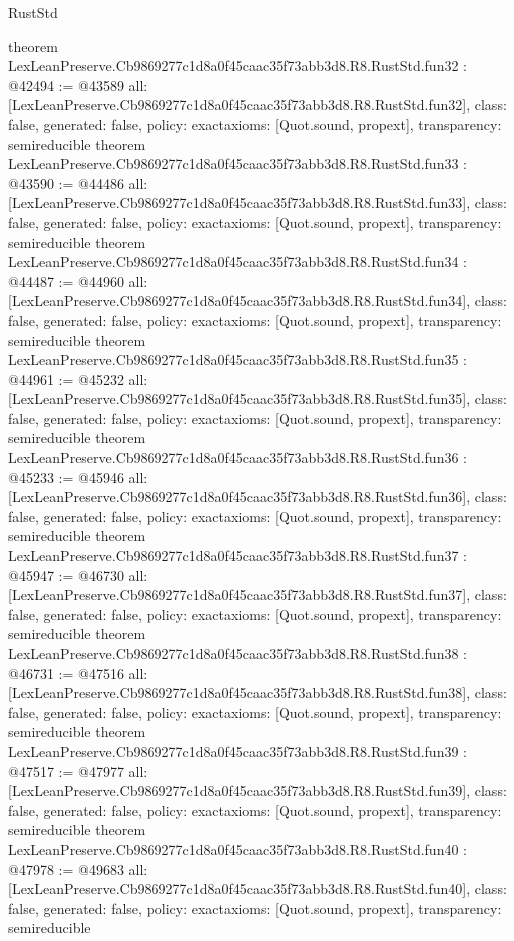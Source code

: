 \begin{lexlean}{RustStd}
\begin{coremodule}
{}
theorem LexLeanPreserve.Cb9869277c1d8a0f45caac35f73abb3d8.R8.RustStd.fun32 : @42494 := @43589 {
  all: [LexLeanPreserve.Cb9869277c1d8a0f45caac35f73abb3d8.R8.RustStd.fun32],
  class: false,
  generated: false,
  policy: exact{axioms: [Quot.sound, propext]},
  transparency: semireducible
}
theorem LexLeanPreserve.Cb9869277c1d8a0f45caac35f73abb3d8.R8.RustStd.fun33 : @43590 := @44486 {
  all: [LexLeanPreserve.Cb9869277c1d8a0f45caac35f73abb3d8.R8.RustStd.fun33],
  class: false,
  generated: false,
  policy: exact{axioms: [Quot.sound, propext]},
  transparency: semireducible
}
theorem LexLeanPreserve.Cb9869277c1d8a0f45caac35f73abb3d8.R8.RustStd.fun34 : @44487 := @44960 {
  all: [LexLeanPreserve.Cb9869277c1d8a0f45caac35f73abb3d8.R8.RustStd.fun34],
  class: false,
  generated: false,
  policy: exact{axioms: [Quot.sound, propext]},
  transparency: semireducible
}
theorem LexLeanPreserve.Cb9869277c1d8a0f45caac35f73abb3d8.R8.RustStd.fun35 : @44961 := @45232 {
  all: [LexLeanPreserve.Cb9869277c1d8a0f45caac35f73abb3d8.R8.RustStd.fun35],
  class: false,
  generated: false,
  policy: exact{axioms: [Quot.sound, propext]},
  transparency: semireducible
}
theorem LexLeanPreserve.Cb9869277c1d8a0f45caac35f73abb3d8.R8.RustStd.fun36 : @45233 := @45946 {
  all: [LexLeanPreserve.Cb9869277c1d8a0f45caac35f73abb3d8.R8.RustStd.fun36],
  class: false,
  generated: false,
  policy: exact{axioms: [Quot.sound, propext]},
  transparency: semireducible
}
theorem LexLeanPreserve.Cb9869277c1d8a0f45caac35f73abb3d8.R8.RustStd.fun37 : @45947 := @46730 {
  all: [LexLeanPreserve.Cb9869277c1d8a0f45caac35f73abb3d8.R8.RustStd.fun37],
  class: false,
  generated: false,
  policy: exact{axioms: [Quot.sound, propext]},
  transparency: semireducible
}
theorem LexLeanPreserve.Cb9869277c1d8a0f45caac35f73abb3d8.R8.RustStd.fun38 : @46731 := @47516 {
  all: [LexLeanPreserve.Cb9869277c1d8a0f45caac35f73abb3d8.R8.RustStd.fun38],
  class: false,
  generated: false,
  policy: exact{axioms: [Quot.sound, propext]},
  transparency: semireducible
}
theorem LexLeanPreserve.Cb9869277c1d8a0f45caac35f73abb3d8.R8.RustStd.fun39 : @47517 := @47977 {
  all: [LexLeanPreserve.Cb9869277c1d8a0f45caac35f73abb3d8.R8.RustStd.fun39],
  class: false,
  generated: false,
  policy: exact{axioms: [Quot.sound, propext]},
  transparency: semireducible
}
theorem LexLeanPreserve.Cb9869277c1d8a0f45caac35f73abb3d8.R8.RustStd.fun40 : @47978 := @49683 {
  all: [LexLeanPreserve.Cb9869277c1d8a0f45caac35f73abb3d8.R8.RustStd.fun40],
  class: false,
  generated: false,
  policy: exact{axioms: [Quot.sound, propext]},
  transparency: semireducible
}
\end{coremodule}
\end{lexlean}
